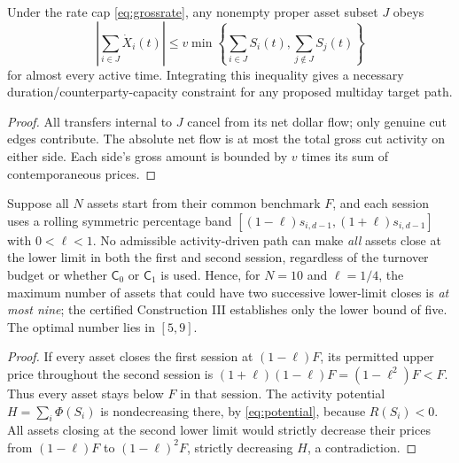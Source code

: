 \documentclass[review,hidelinks,onefignum,onetabnum]{siamonline250211}%
\begin{document}
\begin{proposition}\label{prop:cutcap}
Under the rate cap \eqref{eq:grossrate}, any nonempty proper
asset subset $J$ obeys
\begin{equation}\label{eq:cutcap}
 \left|\sum_{i\in J}\dot X_i(t)\right|
 \le v\min\left\{\sum_{i\in J}S_i(t),
                         \sum_{j\notin J}S_j(t)\right\}
\end{equation}
for almost every active time. Integrating this inequality gives
a necessary duration/counterparty-capacity constraint for any
proposed multiday target path.
\end{proposition}
\begin{proof}
All transfers internal to $J$ cancel from its net dollar flow;
only genuine cut edges contribute. The absolute net flow is at most
the total gross cut activity on either side. Each side's gross
amount is bounded by $v$ times its sum of contemporaneous prices.
\end{proof}

\begin{corollary}
\label{cor:at-most-n-minus-one}
Suppose all $N$ assets start from their common benchmark $F$,
and each session uses a rolling symmetric percentage band
$[(1-\ell)s_{i,d-1},(1+\ell)s_{i,d-1}]$ with
$0<\ell<1$. No admissible activity-driven path can make
\emph{all} assets close at the lower limit in both the first
and second session, regardless of the turnover budget or
whether $\mathsf C_0$ or $\mathsf C_1$ is used. Hence, for
$N=10$ and $\ell=1/4$, the maximum number of assets that
could have two successive lower-limit closes is \emph{at most
nine}; the certified Construction III establishes only the
lower bound of five. The optimal number lies in $[5,9]$.
\end{corollary}
\begin{proof}
If every asset closes the first session at $(1-\ell)F$,
its permitted upper price throughout the second session is
$(1+\ell)(1-\ell)F=(1-\ell^2)F<F$.
Thus every asset stays below $F$ in that session. The
activity potential $H=\sum_i\Phi(S_i)$ is nondecreasing
there, by \eqref{eq:potential}, because $R(S_i)<0$.
All assets closing at the second lower limit would strictly
decrease their prices from $(1-\ell)F$ to
$(1-\ell)^2F$, strictly decreasing $H$, a contradiction.
\end{proof}
\end{document}
